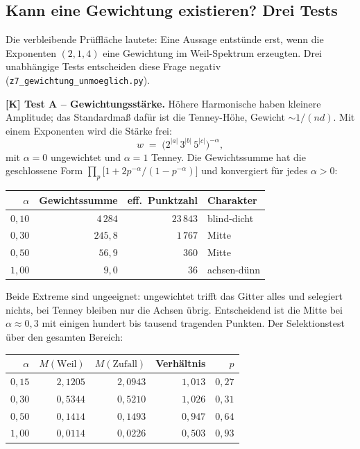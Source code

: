 \subsection{Kann eine Gewichtung existieren? Drei Tests}
\label{sec:gewichtung}

Die verbleibende Pr\"uffl\"ache lautete: Eine Aussage entst\"unde erst,
wenn die Exponenten $(2,1,4)$ eine Gewichtung im Weil-Spektrum
erzeugten. Drei unabh\"angige Tests entscheiden diese Frage negativ
(\texttt{z7\_gewichtung\_unmoeglich.py}).

\textbf{[K] Test A -- Gewichtungsst\"arke.} H\"ohere Harmonische haben
kleinere Amplitude; das Standardma\ss{} daf\"ur ist die Tenney-H\"ohe,
Gewicht $\sim 1/(nd)$. Mit einem Exponenten wird die St\"arke frei:
\[
  w \;=\; \bigl(2^{|a|}\,3^{|b|}\,5^{|c|}\bigr)^{-\alpha},
\]
mit $\alpha = 0$ ungewichtet und $\alpha = 1$ Tenney. Die Gewichtssumme
hat die geschlossene Form
$\prod_p \bigl[1 + 2p^{-\alpha}/(1-p^{-\alpha})\bigr]$ und konvergiert
f\"ur jedes $\alpha > 0$:

\begin{center}
\begin{tabular}{rrrl}
\toprule
$\alpha$ & Gewichtssumme & eff.\ Punktzahl & Charakter \\
\midrule
$0{,}10$ & $4\,284$ & $23\,843$ & blind-dicht \\
$0{,}30$ & $245{,}8$ & $1\,767$ & Mitte \\
$0{,}50$ & $56{,}9$ & $360$ & Mitte \\
$1{,}00$ & $9{,}0$ & $36$ & achsen-d\"unn \\
\bottomrule
\end{tabular}
\end{center}

Beide Extreme sind ungeeignet: ungewichtet trifft das Gitter alles und
selegiert nichts, bei Tenney bleiben nur die Achsen \"ubrig.
Entscheidend ist die Mitte bei $\alpha \approx 0{,}3$ mit einigen
hundert bis tausend tragenden Punkten. Der Selektionstest \"uber den
gesamten Bereich:

\begin{center}
\begin{tabular}{rrrrr}
\toprule
$\alpha$ & $M(\text{Weil})$ & $M(\text{Zufall})$ & Verh\"altnis & $p$ \\
\midrule
$0{,}15$ & $2{,}1205$ & $2{,}0943$ & $1{,}013$ & $0{,}27$ \\
$0{,}30$ & $0{,}5344$ & $0{,}5210$ & $1{,}026$ & $0{,}31$ \\
$0{,}50$ & $0{,}1414$ & $0{,}1493$ & $0{,}947$ & $0{,}64$ \\
$1{,}00$ & $0{,}0114$ & $0{,}0226$ & $0{,}503$ & $0{,}93$ \\
\bottomrule
\end{tabular}
\end{center}

